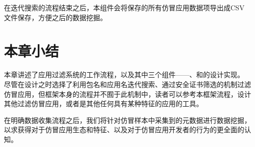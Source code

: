 在迭代搜索的流程结束之后，本组件会将保存的所有仿冒应用数据项导出成CSV文件保存，方便之后的数据挖掘。

\section{本章小结}
本章讲述了应用过滤系统\mytool 的工作流程，以及其中三个组件——\componentA 、\componentB 和\componentC 的设计实现。
尽管\mytool 在设计之时选择了利用包名和应用名迭代搜索、通过安全证书筛选的机制过滤仿冒应用，但框架本身的流程并不囿于此机制中，读者可以参考本框架流程，设计其他过滤仿冒应用，或者是其他任何具有某种特征的应用的工具。

在明确数据收集流程之后，我们将针对仿冒样本中采集到的元数据进行数据挖掘，以求获得对于仿冒应用生态和特征、以及对于仿冒应用开发者的行为的更全面的认知。
